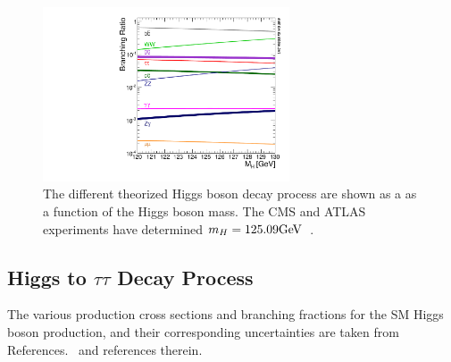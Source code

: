 \begin{figure}[htbp]
\centering
     \includegraphics[width=0.65\textwidth]{phenomology_of_processes/plots/SMHiggsBR_YR4-square.pdf}
     \caption{
The different theorized Higgs boson decay process are shown as a 
as a function of the Higgs boson mass.
The CMS and ATLAS experiments have determined $m_{H} = 125.09\mathrm{GeV}$~\cite{Aad:2015zhl}.
     }
     \label{fig:higgs_decay}
\end{figure}


\subsection{Higgs to $\tau\tau$ Decay Process}




The various production cross sections and branching fractions for the SM Higgs 
boson production, and their corresponding uncertainties are taken from 
References.~\cite{deFlorian:2016spz,Denner:2011mq,Ball:2011mu} and references therein.








